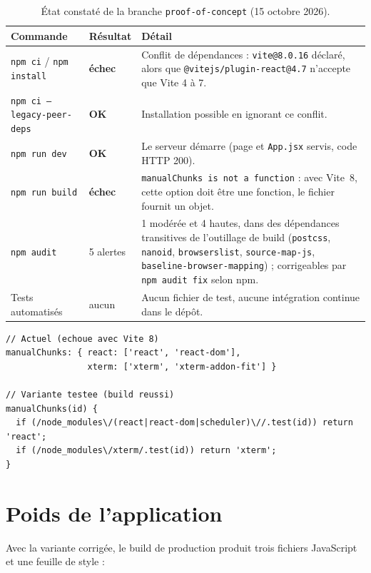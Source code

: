 \documentclass[11pt,a4paper]{report}
\newcommand{\file}[1]{\texttt{\nolinkurl{#1}}}
\newcommand{\ok}{\textcolor{okgreen}{\textbf{OK}}}
\newcommand{\ko}{\textcolor{warnred}{\textbf{échec}}}
\begin{document}
\begin{table}[H]
\centering
\small
\begin{tabularx}{\textwidth}{@{}p{5.2cm}lX@{}}
\toprule
\textbf{Commande} & \textbf{R\'esultat} & \textbf{D\'etail} \\
\midrule
\texttt{npm ci} / \texttt{npm install} & \ko & Conflit de d\'ependances : \texttt{vite@8.0.16} d\'eclar\'e, alors que \texttt{@vitejs/plugin-react@4.7} n'accepte que Vite 4 \`a 7. \\
\texttt{npm ci --legacy-peer-deps} & \ok & Installation possible en ignorant ce conflit. \\
\texttt{npm run dev} & \ok & Le serveur d\'emarre (page et \texttt{App.jsx} servis, code HTTP 200). \\
\texttt{npm run build} & \ko & \texttt{manualChunks is not a function} : avec Vite~8, cette option doit \^etre une fonction, le fichier fournit un objet. \\
\texttt{npm audit} & 5 alertes & 1 mod\'er\'ee et 4 hautes, dans des d\'ependances transitives de l'outillage de build (\texttt{postcss}, \texttt{nanoid}, \texttt{browserslist}, \texttt{source-map-js}, \texttt{baseline-browser-mapping}) ; corrigeables par \texttt{npm audit fix} selon npm. \\
Tests automatis\'es & aucun & Aucun fichier de test, aucune int\'egration continue dans le d\'ep\^ot. \\
\bottomrule
\end{tabularx}
\caption{\'Etat constat\'e de la branche \texttt{proof-of-concept} (15 octobre 2026).}
\end{table}

\begin{lstlisting}[style=js,caption={\file{vite.config.js} : objet actuel (\'echoue en Vite 8) et variante fonctionnelle test\'ee}]
// Actuel (echoue avec Vite 8)
manualChunks: { react: ['react', 'react-dom'],
                xterm: ['xterm', 'xterm-addon-fit'] }

// Variante testee (build reussi)
manualChunks(id) {
  if (/node_modules\/(react|react-dom|scheduler)\//.test(id)) return 'react';
  if (/node_modules\/xterm/.test(id)) return 'xterm';
}
\end{lstlisting}

\section{Poids de l'application}

Avec la variante corrig\'ee, le build de production produit trois fichiers JavaScript et
une feuille de style :
\end{document}
